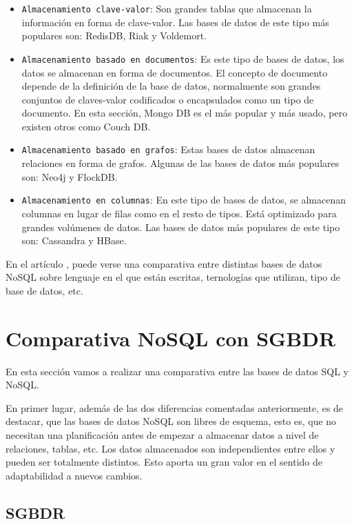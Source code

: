 \begin{itemize}
    \item \texttt{Almacenamiento clave-valor}: Son grandes tablas que almacenan la información en forma de clave-valor. Las bases de datos de este tipo más populares son: RedisDB, Riak y Voldemort.
    \item \texttt{Almacenamiento basado en documentos}: Es este tipo de bases de datos, los datos se almacenan en forma de documentos. El concepto de documento depende de la definición de la base de datos, normalmente son grandes conjuntos de claves-valor codificados o encapsulados como un tipo de documento. En esta sección, Mongo DB es el más popular y más usado, pero existen otros como Couch DB.
    \item \texttt{Almacenamiento basado en grafos}: Estas bases de datos almacenan relaciones en forma de grafos. Algunas de las bases de datos más populares son: Neo4j y FlockDB.
    \item \texttt{Almacenamiento en columnas}: En este tipo de bases de datos, se almacenan columnas en lugar de filas como en el resto de tipos. Está optimizado para grandes volúmenes de datos. Las bases de datos más populares de este tipo son: Cassandra y HBase.
\end{itemize}

En el artículo \cite{nosqlcomparativas}, puede verse una comparativa entre distintas bases de datos NoSQL sobre lenguaje en el que están escritas, ternologías que utilizan, tipo de base de datos, etc.

\section{Comparativa NoSQL con SGBDR}

En esta sección vamos a realizar una comparativa entre las bases de datos SQL y NoSQL.

En primer lugar, además de las dos diferencias comentadas anteriormente, es de destacar, que las bases de datos NoSQL son libres de esquema, esto es, que no necesitan una planificación antes de empezar a almacenar datos a nivel de relaciones, tablas, etc. Los datos almacenados son independientes entre ellos y pueden ser totalmente distintos. Esto aporta un gran valor en el sentido de adaptabilidad a nuevos cambios.

\subsection{SGBDR}

